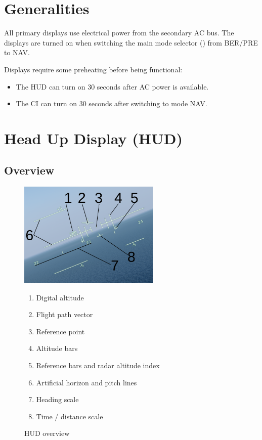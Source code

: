 \section{Generalities}
All primary displays use electrical power from the secondary AC bus.
The displays are turned on when switching the main mode selector
() from BER/PRE to NAV.

Displays require some preheating before being functional:
\begin{itemize}
  \item The HUD can turn on 30 seconds after AC power is available.
  \item The CI can turn on 30 seconds after switching to mode NAV.
\end{itemize}

\section{Head Up Display (HUD)}
\subsection{Overview}
\begin{figure}[!ht]
  \centering
  \includegraphics[width=0.6\textwidth]{images/displays/ajs-hud-general.png}

  \begin{multicols}{2}
    \begin{enumerate}[nosep]
      \item \label{item:digalt} Digital altitude
      \item \label{item:fpv} Flight path vector
      \item \label{item:refpt} Reference point
      \item \label{item:alt} Altitude bars
      \item \label{item:refbars} Reference bars and radar altitude index
      \item \label{item:horizon} Artificial horizon and pitch lines
      \item \label{item:heading} Heading scale
      \item \label{item:timeline} Time / distance scale
    \end{enumerate}
  \end{multicols}

  \caption{HUD overview}
  \label{fig:hud}
\end{figure}

